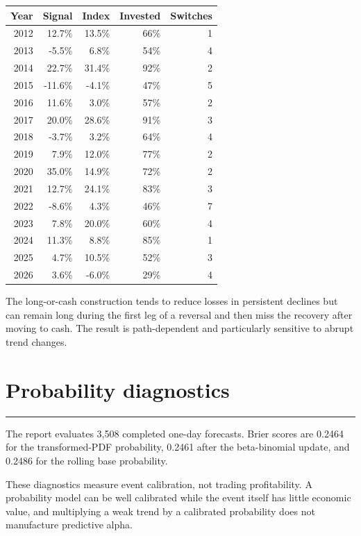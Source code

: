 \documentclass[11pt,a4paper]{article}
\newcommand{\sectionrule}{\vspace{-0.5em}\par\noindent\color{SignalGreen}\rule{\linewidth}{0.7pt}\color{Ink}\par\vspace{0.3em}}
\begin{document}
\begin{center}
\small
\begin{longtable}{rrrrr}
\toprule
Year & Signal & Index & Invested & Switches \\
\midrule
\endhead
2012 & 12.7\% & 13.5\% & 66\% & 1 \\
2013 & -5.5\% & 6.8\% & 54\% & 4 \\
2014 & 22.7\% & 31.4\% & 92\% & 2 \\
2015 & -11.6\% & -4.1\% & 47\% & 5 \\
2016 & 11.6\% & 3.0\% & 57\% & 2 \\
2017 & 20.0\% & 28.6\% & 91\% & 3 \\
2018 & -3.7\% & 3.2\% & 64\% & 4 \\
2019 & 7.9\% & 12.0\% & 77\% & 2 \\
2020 & 35.0\% & 14.9\% & 72\% & 2 \\
2021 & 12.7\% & 24.1\% & 83\% & 3 \\
2022 & -8.6\% & 4.3\% & 46\% & 7 \\
2023 & 7.8\% & 20.0\% & 60\% & 4 \\
2024 & 11.3\% & 8.8\% & 85\% & 1 \\
2025 & 4.7\% & 10.5\% & 52\% & 3 \\
2026 & 3.6\% & -6.0\% & 29\% & 4 \\
\bottomrule
\end{longtable}
\end{center}

The long-or-cash construction tends to reduce losses in persistent declines but can remain long during the first leg of a reversal and then miss the recovery after moving to cash. The result is path-dependent and particularly sensitive to abrupt trend changes.

\clearpage
\section{Probability diagnostics}
\sectionrule
The report evaluates 3,508 completed one-day forecasts. Brier scores are 0.2464 for the transformed-PDF probability, 0.2461 after the beta-binomial update, and 0.2486 for the rolling base probability.

These diagnostics measure event calibration, not trading profitability. A probability model can be well calibrated while the event itself has little economic value, and multiplying a weak trend by a calibrated probability does not manufacture predictive alpha.
\end{document}
